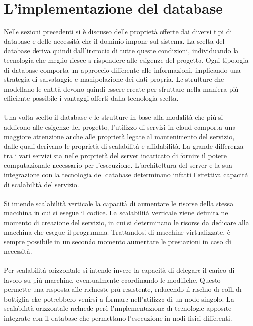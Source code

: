 \section{L'implementazione del database}
Nelle sezioni precedenti si è discusso delle proprietà
offerte dai diversi tipi di database e
delle necessità che il dominio impone sul sistema.
La scelta del database deriva quindi dall'incrocio di tutte queste condizioni,
individuando la tecnologia che meglio riesce a rispondere alle esigenze del progetto.
Ogni tipologia di database comporta un approccio differente alle informazioni,
implicando una strategia di salvataggio e manipolazione dei dati propria.
Le strutture che modellano le entità devono quindi
essere create per sfruttare nella maniera più efficiente possibile
i vantaggi offerti dalla tecnologia scelta.\\
\\
Una volta scelto il database e le strutture in base alla modalità
che più si addicono alle esigenze del progetto,
l'utilizzo di servizi in cloud comporta una maggiore attenzione anche
alle proprietà legate al mantenimento del servizio,
dalle quali derivano le proprietà di scalabilità e affidabilità.
La grande differenza tra i vari servizi sta nelle proprietà del server
incaricato di fornire il potere computazionale necessario per l’esecuzione.
L’architettura del server e la sua integrazione con la tecnologia del database
determinano infatti l’effettiva capacità di scalabilità del servizio.\\
\\
Si intende scalabilità verticale la capacità di aumentare le risorse
della stessa macchina in cui si esegue il codice.
La scalabilità verticale viene definita nel momento di creazione del servizio,
in cui si determinano le risorse da dedicare alla macchina che esegue il programma.
Trattandosi di macchine virtualizzate,
è sempre possibile in un secondo momento aumentare le prestazioni in caso di necessità.\\
\\
Per scalabilità orizzontale si intende invece la capacità di
delegare il carico di lavoro su più macchine, eventualmente coordinando le modifiche.
Questo permette una risposta alle richieste più resistente,
riducendo il rischio di colli di bottiglia che potrebbero venirsi a formare nell’utilizzo di un nodo singolo.
La scalabilità orizzontale richiede però l'implementazione
di tecnologie apposite integrate con il database che permettano l'esecuzione in nodi fisici differenti. \\
